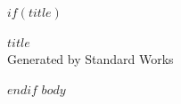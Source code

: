 \documentclass[11pt]{article}
\begin{document}
$if(title)$
\begin{center}
{\LARGE \textbf{$title$}}\\[6pt]
{\small Generated by Standard Works}
\end{center}
\vspace{8pt}
$endif$
$body$
\end{document}
